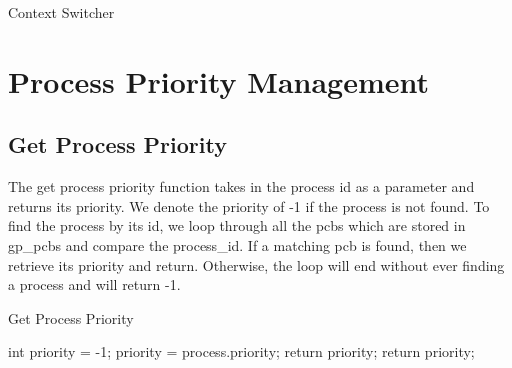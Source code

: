 \documentclass[12pt]{report}
\begin{document}
\begin{algorithm}[H]
  \caption{Context Switcher}
  \begin{algorithmic}[1]
				\EndIf
			\EndIf
		\EndIf
	  \EndIf
	  
		\EndIf
	
	  \EndIf
	\EndProcedure
  \end{algorithmic}
\end{algorithm}


\section{Process Priority Management}

\subsection{Get Process Priority}

The get process priority function takes in the process id as a parameter and returns its priority. We denote the priority of -1 if the process is not found. To find the process by its id, we loop through all the pcbs which are stored in gp_pcbs and compare the process_id. If a matching pcb is found, then we retrieve its priority and return. Otherwise, the loop will end without ever finding a process and will return -1.

\begin{algorithm}[H]
  \caption{Get Process Priority}
  \begin{algorithmic}[1]
  \State int priority = -1;
      \State priority = process.priority;
      \State return priority;
     \EndIf
  \EndFor
  \State return priority;
  \EndFunction
  \end{algorithmic}
\end{algorithm}
\end{document}
